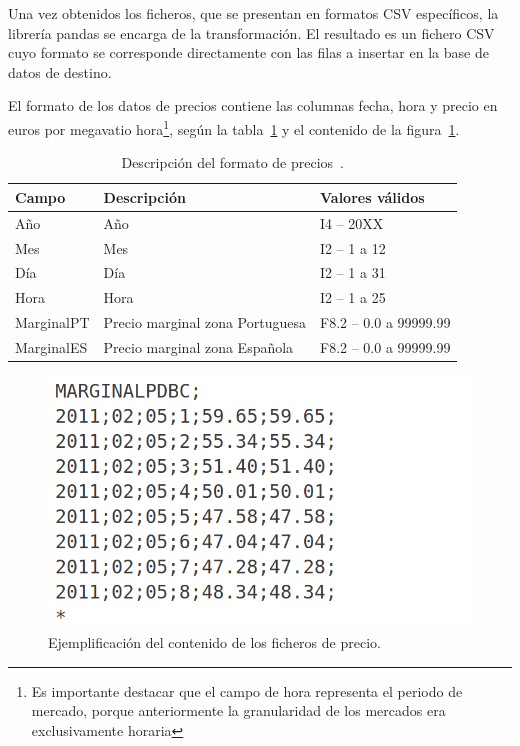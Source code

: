 Una vez obtenidos los ficheros, que se presentan en formatos CSV específicos, la librería pandas se encarga de la transformación. El resultado es un fichero CSV cuyo formato se corresponde directamente con las filas a insertar en la base de datos de destino.

El formato de los datos de precios contiene las columnas fecha, hora y precio en euros por megavatio hora\footnote{Es importante destacar que el campo de hora representa el periodo de mercado, porque anteriormente la granularidad de los mercados era exclusivamente horaria}, según la tabla~\ref{tab:descripción-precio} y el contenido de la figura~\ref{fig:contenido-precio}.

\begin{table}[ht]
  \centering
  \begin{tabular}{|l|p{7.5cm}|l|}
    \hline
    Campo      & Descripción                     & Valores válidos        \\
    \hline
    Año        & Año                             & I4 -- 20XX             \\
    Mes        & Mes                             & I2 -- 1 a 12           \\
    Día        & Día                             & I2 -- 1 a 31           \\
    Hora       & Hora                            & I2 -- 1 a 25           \\
    MarginalPT & Precio marginal zona Portuguesa & F8.2 -- 0.0 a 99999.99 \\
    MarginalES & Precio marginal zona Española   & F8.2 -- 0.0 a 99999.99 \\
    \hline
  \end{tabular}
  \caption[Descripción del formato de precios.]{Descripción del formato de precios~\cite{omie2025modelo}.}
  \label{tab:descripción-precio}
\end{table}

\begin{figure}
  \centering
  \includegraphics[width=0.5\linewidth]{figures/contenido-precio.png}
  \caption[Ejemplificación del contenido de los ficheros de precio.]{Ejemplificación del contenido de los ficheros de precio.}
  \label{fig:contenido-precio}
\end{figure}

